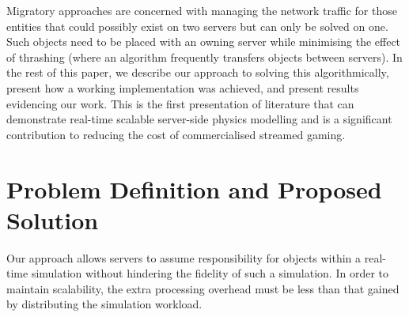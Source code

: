 Migratory approaches are concerned with managing the network traffic for those entities that could possibly exist on two servers but can only be solved on one. Such objects need to be placed with an owning server while minimising the effect of thrashing (where an algorithm frequently transfers objects between servers). In the rest of this paper, we describe our approach to solving this algorithmically, present how a working implementation was achieved, and present results evidencing our work. This is the first presentation of literature that can demonstrate real-time scalable server-side physics modelling and is a significant contribution to reducing the cost of commercialised streamed gaming.

\chapter{Problem Definition and Proposed Solution}
Our approach allows servers to assume responsibility for objects within a real-time simulation without hindering the fidelity of such a simulation. In order to maintain scalability, the extra processing overhead must be less than that gained by distributing the simulation workload. 
	
